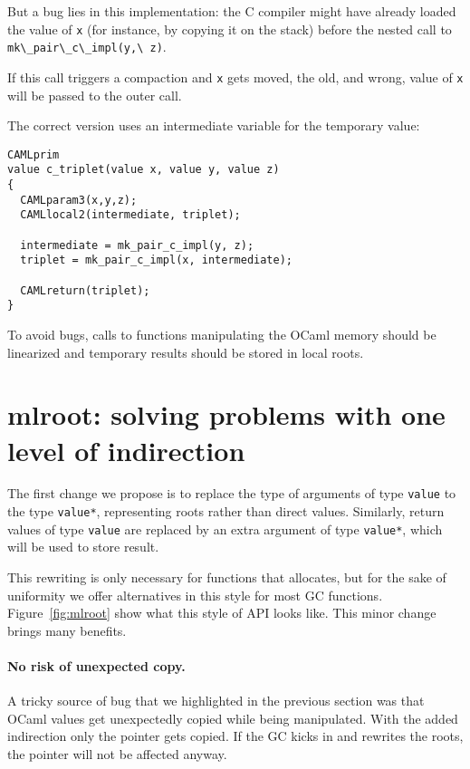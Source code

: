 \documentclass[a4paper]{easychair}
\newcommand{\cpp}[1]{\lstinline[style=C++]{#1}}
\begin{document}
But a bug lies in this implementation: the C compiler might have already
loaded the value of \cpp{x} (for instance, by copying it on the
stack) before the nested call to \cpp{mk\_pair\_c\_impl(y,\ z)}.

If this call triggers a compaction and \cpp{x} gets moved, the old,
and wrong, value of \cpp{x} will be passed to the outer call.

The correct version uses an intermediate variable for the temporary
value:
%
\begin{lstlisting}[style=C++]
CAMLprim
value c_triplet(value x, value y, value z)
{
  CAMLparam3(x,y,z);
  CAMLlocal2(intermediate, triplet);

  intermediate = mk_pair_c_impl(y, z);
  triplet = mk_pair_c_impl(x, intermediate);

  CAMLreturn(triplet);
}
\end{lstlisting}

To avoid bugs, calls to functions manipulating the OCaml memory should be
linearized and temporary results should be stored in local roots.

\section{mlroot: solving problems with one level of indirection}

The first change we propose is to replace the type of arguments of type \cpp{value}
to the type \cpp{value*}, representing roots rather than direct values.
Similarly, return values of type \cpp{value} are replaced by an extra argument
of type \cpp{value*}, which will be used to store result.

This rewriting is only necessary for functions that allocates, but for the sake
of uniformity we offer alternatives in this style for most GC functions.
Figure~\ref{fig:mlroot} show what this style of API looks like.
This minor change brings many benefits.

\paragraph{No risk of unexpected copy.}

A tricky source of bug that we highlighted in the previous section was
that OCaml values get unexpectedly copied while being manipulated. With
the added indirection only the pointer gets copied. If the GC kicks in and
rewrites the roots, the pointer will not be affected anyway.
\end{document}
